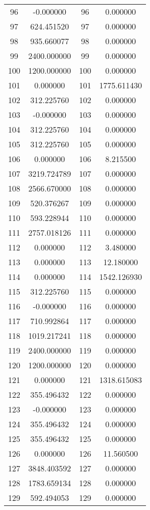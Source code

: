 \documentclass[12pt]{article}
\begin{document}
\begin{longtable}{@{}cccc@{}}
96 & -0.000000 & 96 & 0.000000 \\
97 & 624.451520 & 97 & 0.000000 \\
98 & 935.660077 & 98 & 0.000000 \\
99 & 2400.000000 & 99 & 0.000000 \\
100 & 1200.000000 & 100 & 0.000000 \\
101 & 0.000000 & 101 & 1775.611430 \\
102 & 312.225760 & 102 & 0.000000 \\
103 & -0.000000 & 103 & 0.000000 \\
104 & 312.225760 & 104 & 0.000000 \\
105 & 312.225760 & 105 & 0.000000 \\
106 & 0.000000 & 106 & 8.215500 \\
107 & 3219.724789 & 107 & 0.000000 \\
108 & 2566.670000 & 108 & 0.000000 \\
109 & 520.376267 & 109 & 0.000000 \\
110 & 593.228944 & 110 & 0.000000 \\
111 & 2757.018126 & 111 & 0.000000 \\
112 & 0.000000 & 112 & 3.480000 \\
113 & 0.000000 & 113 & 12.180000 \\
114 & 0.000000 & 114 & 1542.126930 \\
115 & 312.225760 & 115 & 0.000000 \\
116 & -0.000000 & 116 & 0.000000 \\
117 & 710.992864 & 117 & 0.000000 \\
118 & 1019.217241 & 118 & 0.000000 \\
119 & 2400.000000 & 119 & 0.000000 \\
120 & 1200.000000 & 120 & 0.000000 \\
121 & 0.000000 & 121 & 1318.615083 \\
122 & 355.496432 & 122 & 0.000000 \\
123 & -0.000000 & 123 & 0.000000 \\
124 & 355.496432 & 124 & 0.000000 \\
125 & 355.496432 & 125 & 0.000000 \\
126 & 0.000000 & 126 & 11.560500 \\
127 & 3848.403592 & 127 & 0.000000 \\
128 & 1783.659134 & 128 & 0.000000 \\
129 & 592.494053 & 129 & 0.000000 \\

\end{longtable}
\end{document}
